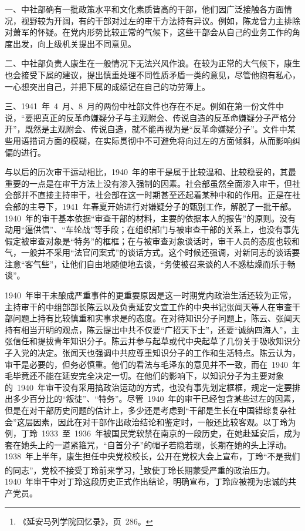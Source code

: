 一、中社部确有一批政策水平和文化素质皆高的干部，他们因广泛接触各方面情况，视野较为开阔，有的干部对过左的审干方法持有异议。例如，陈龙曾力主排除对萧军的怀疑。在党内形势比较正常的气候下，这些干部会从自己的业务工作的角度出发，向上级机关提出不同意见。

二、中社部负责人康生在一般情况下无法兴风作浪。在较为正常的大气候下，康生也会接受下属的建议，提出慎重处理不同性质矛盾一类的意见，尽管他抱有私心，一心想突出自己，并把下属的成绩记在自己的功劳簿上。

三、1941~年~4~月、8~月的两份中社部文件也存在不足。例如在第一份文件中说，“要把真正的反革命嫌疑分子与主观附会、传说自造的反革命嫌疑分子严格分开”，既然是主观附会、传说自造，就不能再视为是“反革命嫌疑分子”。文件中某些用语措词方面的模糊，在实际贯彻中不可避免将向过左的方面倾斜，从而影响纠偏的进行。

与以后的历次审干运动相比，1940~年的审干是属于比较温和、比较稳妥的，其最重要的一点是在审干方法上没有渗入强制的因素。社会部虽然全面渗入审干，但社会部并不直接主持审干，社会部在这一时期甚至还起着某种中和的作用。正是在社会部的主导下，1941~年春夏开始进行对嫌疑分子的甄别工作，解脱了一批干部。1940~年的审干基本依据“审查干部的材料，主要的依据本人的报告”的原则。没有动用“逼供信”、“车轮战”等手段；在组织部门与被审查干部的关系上，也没有事先假定被审查对象是“特务”的框框；在与被审查对象谈话时，审干人员的态度也较和气，一般并不采用“法官问案式”的谈话方式。这个时候还强调，对新同志的谈话要注意“客气些”，让他们自由地随便地去谈，“务使被召来谈的人不感枯燥而乐于畅谈”。

1940~年审干未酿成严重事件的更重要原因是这一时期党内政治生活还较为正常，主持审干的中组部部长陈云以及负责延安文宣工作的中央书记张闻天等人在审查干部问题上持有比较慎重和实事求是的态度。在对待知识分子问题上，陈云、张闻天持有相当开明的观点，陈云提出中共不仅要“广招天下士”，还要“诚纳四海人”，主张信任和提拔青年知识分子。陈云并参与起草或代中央起草了几份关于吸收知识分子入党的决定。张闻天也强调中共应尊重知识分子的工作和生活特点。陈云认为，审干是必要的，但务必慎重。他们的看法与毛泽东的意见并不一致，而在~1940~年毛毕竟还不能在延安完全决定一切。在他们的影响下，以知识分子为主要对象的~1940~年审干没有采用搞政治运动的方式，也没有事先划定框框，规定一定要排出多少百分比的“叛徒”、“特务”。尽管~1940~年的审干已经包含某些过左的因素，但是在对干部历史问题的估计上，多少还是考虑到“干部是生长在中国错综复杂社会”这层因素，因此在对干部作出政治结论和鉴定时，一般还比较客观。以丁玲为例，丁玲~1933~至~1936~年被国民党软禁在南京的一段历史，在她赴延安后，成为套在她头上的一道紧箍咒，“自首分子”的帽子若隐若现，长期在她的头上浮动。1938~年上半年，康生担任中央党校校长，公开在党校大会上宣布，丁玲“不是我们的同志”，党校不接受丁玲前来学习，\footnote{《延安马列学院回忆录》，页~286。}致使丁玲长期蒙受严重的政治压力。1940~年审干中对丁玲这段历史正式作出结论，明确宣布，丁玲应被视为忠诚的共产党员。

